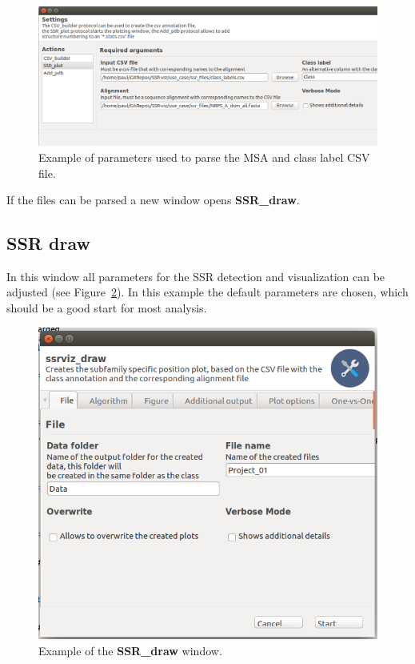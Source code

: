 \documentclass[a4paper,10pt]{article}
\begin{document}
\begin{figure}
  \includegraphics[width=\linewidth]{./figs/ssr_plot}
  \caption{Example of parameters used to parse the MSA and class label CSV file.}
  \label{fig:ssr_plot}
\end{figure}

If the files can be parsed a new window opens \textbf{SSR\_draw}.

\subsection{SSR draw}

In this window all parameters for the SSR detection and visualization can be adjusted (see Figure~\ref{fig:ssr_draw}). In this example the default parameters 
are chosen, which should be a good start for most analysis.

\begin{figure}
  \includegraphics[width=\linewidth]{./figs/ssr_draw}
  \caption{Example of the \textbf{SSR\_draw} window.}
  \label{fig:ssr_draw}
\end{figure}
\end{document}
